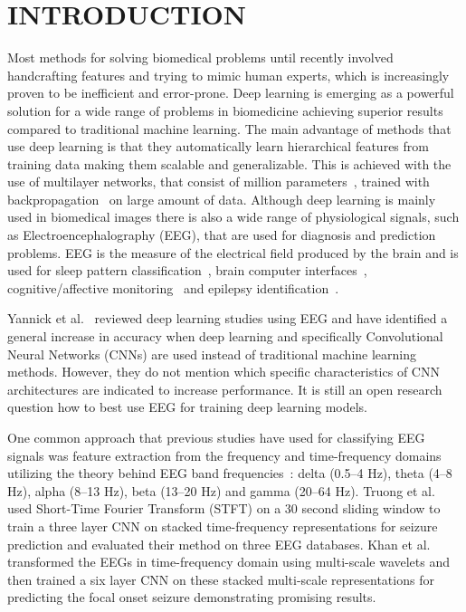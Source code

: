 \documentclass[conference]{IEEEtran}
\begin{document}
\section{INTRODUCTION}
Most methods for solving biomedical problems until recently involved handcrafting features and trying to mimic human experts, which is increasingly proven to be inefficient and error-prone.
Deep learning is emerging as a powerful solution for a wide range of problems in biomedicine achieving superior results compared to traditional machine learning.
The main advantage of methods that use deep learning is that they automatically learn hierarchical features from training data making them scalable and generalizable.
This is achieved with the use of multilayer networks, that consist of million parameters~\cite{krizhevsky2012imagenet}, trained with backpropagation~\cite{rumelhart1986learning} on large amount of data.
Although deep learning is mainly used in biomedical images there is also a wide range of physiological signals, such as Electroencephalography (EEG), that are used for diagnosis and prediction problems.
EEG is the measure of the electrical field produced by the brain and is used for sleep pattern classification~\cite{aboalayon2016sleep}, brain computer interfaces~\cite{al2017review}, cognitive/affective monitoring~\cite{lotte1999electroencephalography} and epilepsy identification~\cite{acharya2013automated}.

Yannick et al.~\cite{yannick2019deep} reviewed deep learning studies using EEG and have identified a general increase in accuracy when deep learning and specifically Convolutional Neural Networks (CNNs) are used instead of traditional machine learning methods.
However, they do not mention which specific characteristics of CNN architectures are indicated to increase performance.
It is still an open research question how to best use EEG for training deep learning models.

One common approach that previous studies have used for classifying EEG signals was feature extraction from the frequency and time-frequency domains utilizing the theory behind EEG band frequencies~\cite{langkvist2012sleep}: delta (0.5--4 Hz), theta (4--8 Hz), alpha (8--13 Hz), beta (13--20 Hz) and gamma (20--64 Hz).
Truong et al.~\cite{truong2018convolutional} used Short-Time Fourier Transform (STFT) on a 30 second sliding window to train a three layer CNN on stacked time-frequency representations for seizure prediction and evaluated their method on three EEG databases.
Khan et al.~\cite{khan2018focal} transformed the EEGs in time-frequency domain using multi-scale wavelets and then trained a six layer CNN on these stacked multi-scale representations for predicting the focal onset seizure demonstrating promising results.
\end{document}
